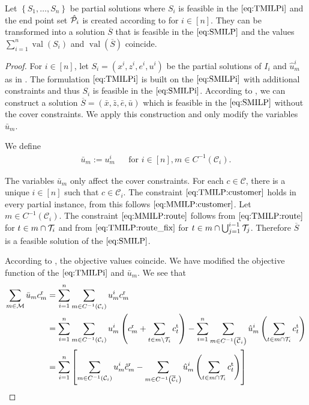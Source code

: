 \begin{theorem}
\label{thm:equivalence_TMILP_SMILP}

Let $\left\{S_1,\dots,S_n\right\}$ be partial solutions where $S_i$ is feasible in the $\eqref{eq:TMILPi}$ and the end point set $\hat{\mathcal{P}}_i$ is created according to  for ${i\in[n]}$. They can be transformed into a solution $\overline{S}$ that is feasible in the $\eqref{eq:SMILP}$ and the values ${\sum_{i=1}^n \operatorname{val}\left(S_i\right)}$ and ${\operatorname{val}(\overline{S})}$ coincide.

\end{theorem}

\begin{proof}

For ${i\in[n]}$, let ${S_i=\left(x^i,z^i,e^i,u^i\right)}$ be the partial solutions of $I_i$ and $\hat{u}^i_m$ as in . The formulation $\eqref{eq:TMILPi}$ is built on the $\eqref{eq:SMILPi}$ with additional constraints and thus $S_i$ is feasible in the $\eqref{eq:SMILPi}$. According to , we can construct a solution ${\overline{S}=\left(\bar{x},\bar{z},\bar{e},\bar{u}\right)}$ which is feasible in the $\eqref{eq:SMILP}$ without the cover constraints. We apply this construction and only modify the variables $\bar{u}_m$.

We define
\begin{align*}
	\bar{u}_m := u^i_m && \text{for } i\in[n], m\in C^{-1}\left(\mathcal{C}_i\right).
\end{align*}

The variables $\bar{u}_m$ only affect the cover constraints. For each ${c\in\mathcal{C}}$, there is a unique ${i\in[n]}$ such that ${c\in\mathcal{C}_i}$. The constraint $\eqref{eq:TMILP:customer}$ holds in every partial instance, from this follows $\eqref{eq:MMILP:customer}$. Let ${m\in C^{-1}\left(\mathcal{C}_i\right)}$. The constraint $\eqref{eq:MMILP:route}$ follows from $\eqref{eq:TMILP:route}$ for ${t\in m\cap\mathcal{T}_i}$ and from $\eqref{eq:TMILP:route_fix}$ for ${t\in m\cap\bigcup_{j=1}^{i-1}\mathcal{T}_j}$. Therefore $\overline{S}$ is a feasible solution of the $\eqref{eq:SMILP}$.

According to , the objective values coincide. We have modified the objective function of the $\eqref{eq:TMILPi}$ and $\bar{u}_m$. We see that
\begin{align*}
	\sum_{m\in\mathcal{M}} \bar{u}_m c^{\operatorname{r}}_m & = \sum_{i=1}^n \sum_{m\in C^{-1}\left(\mathcal{C}_i\right)} u^i_m c^{\operatorname{r}}_m \\
	& = \sum_{i=1}^n \sum_{m\in C^{-1}\left(\mathcal{C}_i\right)} u^i_m\left(c^{\operatorname{r}}_m + \sum_{t\in m\backslash\mathcal{T}_i} c^{\operatorname{t}}_t\right) - \sum_{i=1}^n \sum_{m\in C^{-1}\left(\overline{\mathcal{C}}_i\right)} \hat{u}^i_m\left(\sum_{t\in m\cap\mathcal{T}_i} c^{\operatorname{t}}_t\right) \\
	& = \sum_{i=1}^n \left[\sum_{m\in C^{-1}\left(\mathcal{C}_i\right)} u^i_m \hat{c}^{\operatorname{r}}_m - \sum_{m\in C^{-1}\left(\overline{\mathcal{C}}_i\right)} \hat{u}^i_m \left(\sum_{t\in m\cap\mathcal{T}_i} c^{\operatorname{t}}_t\right)\right]
\end{align*}


\end{proof}
